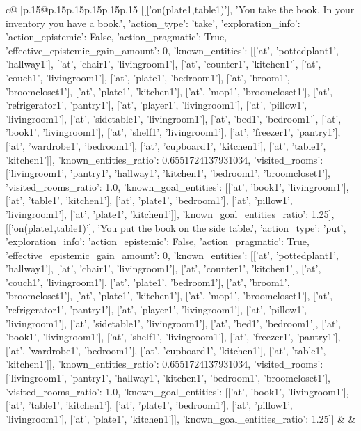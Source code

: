 \documentclass{article}
\begin{document}
{\begin{supertabular}{c@{$\;$}|p{.15\linewidth}@{}p{.15\linewidth}p{.15\linewidth}p{.15\linewidth}p{.15\linewidth}p{.15\linewidth}}
{{{	 [[['on(plate1,table1)'], 'You take the book. In your inventory you have a book.', {'action_type': 'take', 'exploration_info': {'action_epistemic': False, 'action_pragmatic': True, 'effective_epistemic_gain_amount': 0, 'known_entities': [['at', 'pottedplant1', 'hallway1'], ['at', 'chair1', 'livingroom1'], ['at', 'counter1', 'kitchen1'], ['at', 'couch1', 'livingroom1'], ['at', 'plate1', 'bedroom1'], ['at', 'broom1', 'broomcloset1'], ['at', 'plate1', 'kitchen1'], ['at', 'mop1', 'broomcloset1'], ['at', 'refrigerator1', 'pantry1'], ['at', 'player1', 'livingroom1'], ['at', 'pillow1', 'livingroom1'], ['at', 'sidetable1', 'livingroom1'], ['at', 'bed1', 'bedroom1'], ['at', 'book1', 'livingroom1'], ['at', 'shelf1', 'livingroom1'], ['at', 'freezer1', 'pantry1'], ['at', 'wardrobe1', 'bedroom1'], ['at', 'cupboard1', 'kitchen1'], ['at', 'table1', 'kitchen1']], 'known_entities_ratio': 0.6551724137931034, 'visited_rooms': ['livingroom1', 'pantry1', 'hallway1', 'kitchen1', 'bedroom1', 'broomcloset1'], 'visited_rooms_ratio': 1.0, 'known_goal_entities': [['at', 'book1', 'livingroom1'], ['at', 'table1', 'kitchen1'], ['at', 'plate1', 'bedroom1'], ['at', 'pillow1', 'livingroom1'], ['at', 'plate1', 'kitchen1']], 'known_goal_entities_ratio': 1.25}}], [['on(plate1,table1)'], 'You put the book on the side table.', {'action_type': 'put', 'exploration_info': {'action_epistemic': False, 'action_pragmatic': True, 'effective_epistemic_gain_amount': 0, 'known_entities': [['at', 'pottedplant1', 'hallway1'], ['at', 'chair1', 'livingroom1'], ['at', 'counter1', 'kitchen1'], ['at', 'couch1', 'livingroom1'], ['at', 'plate1', 'bedroom1'], ['at', 'broom1', 'broomcloset1'], ['at', 'plate1', 'kitchen1'], ['at', 'mop1', 'broomcloset1'], ['at', 'refrigerator1', 'pantry1'], ['at', 'player1', 'livingroom1'], ['at', 'pillow1', 'livingroom1'], ['at', 'sidetable1', 'livingroom1'], ['at', 'bed1', 'bedroom1'], ['at', 'book1', 'livingroom1'], ['at', 'shelf1', 'livingroom1'], ['at', 'freezer1', 'pantry1'], ['at', 'wardrobe1', 'bedroom1'], ['at', 'cupboard1', 'kitchen1'], ['at', 'table1', 'kitchen1']], 'known_entities_ratio': 0.6551724137931034, 'visited_rooms': ['livingroom1', 'pantry1', 'hallway1', 'kitchen1', 'bedroom1', 'broomcloset1'], 'visited_rooms_ratio': 1.0, 'known_goal_entities': [['at', 'book1', 'livingroom1'], ['at', 'table1', 'kitchen1'], ['at', 'plate1', 'bedroom1'], ['at', 'pillow1', 'livingroom1'], ['at', 'plate1', 'kitchen1']], 'known_goal_entities_ratio': 1.25}}]] 
	  } 
	   } 
	   } 
	 & & \\ 
 

    \theutterance {}  


\end{supertabular}}
\end{document}
